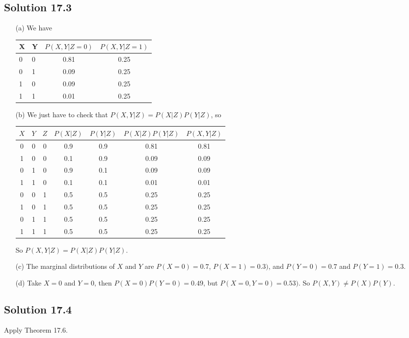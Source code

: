 \subsection*{Solution 17.3}

\begin{itemize}
    \item[(a)]
        We have
        \begin{table}[H]
            \begin{tabular}{l|l||c|c}
                X & Y & $P(X,Y|Z=0)$ & $P(X,Y|Z=1)$ \\ \hline \hline
                0 & 0 & 0.81         & 0.25         \\ \hline
                0 & 1 & 0.09         & 0.25         \\ \hline
                1 & 0 & 0.09         & 0.25         \\ \hline
                1 & 1 & 0.01         & 0.25
            \end{tabular}
        \end{table}
    \item[(b)] We just have to check that $P(X,Y|Z) = P(X|Z)P(Y|Z)$, so
        \begin{table}[H]
            \begin{tabular}{c|c|c||c|c|c|c}
                $X$ & $Y$ & $Z$ & $P(X|Z)$ & $P(Y|Z)$ & $P(X|Z)P(Y|Z)$ & $P(X,Y|Z)$ \\ \hline \hline
                0   & 0   & 0   & 0.9      & 0.9      & 0.81           & 0.81       \\ \hline
                1   & 0   & 0   & 0.1      & 0.9      & 0.09           & 0.09       \\ \hline
                0   & 1   & 0   & 0.9      & 0.1      & 0.09           & 0.09       \\ \hline
                1   & 1   & 0   & 0.1      & 0.1      & 0.01           & 0.01       \\ \hline
                0   & 0   & 1   & 0.5      & 0.5      & 0.25           & 0.25       \\ \hline
                1   & 0   & 1   & 0.5      & 0.5      & 0.25           & 0.25       \\ \hline
                0   & 1   & 1   & 0.5      & 0.5      & 0.25           & 0.25       \\ \hline
                1   & 1   & 1   & 0.5      & 0.5      & 0.25           & 0.25
            \end{tabular}
        \end{table}
        So $P(X,Y|Z) = P(X|Z)P(Y|Z)$.
    \item[(c)] The marginal distributions of $X$ and $Y$ are $P(X = 0) = 0.7$, $P(X = 1) = 0.3)$, and $P(Y = 0) = 0.7$ and $P(Y = 1) = 0.3$.
    \item[(d)] Take $X = 0$ and $Y = 0$, then $P(X=0)P(Y=0) = 0.49$, but $P(X=0,Y=0) = 0.53)$.
        So $P(X, Y) \neq P(X)P(Y)$.
\end{itemize}


\subsection*{Solution 17.4}

Apply Theorem 17.6.
